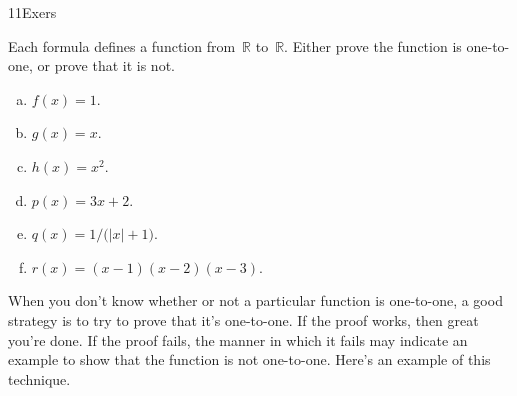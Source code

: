 
\begin{exercise}{11Exers}

 Each formula defines a function from~$\mathbb{R}$ to~$\mathbb{R}$. Either prove the function is one-to-one, or prove that it is not.
\begin{multicols}{2}
 \begin{enumerate}[(a)]
\item \label{11Exers-formula-f}
$f(x) = 1$.
\item \label{11Exers-formula-g}
$g(x) = x$.
\item \label{11Exers-formula-h}
$h(x) = x^2$.
\item \label{11Exers-formula-i}
$p(x) = 3x + 2$.
\item \label{11Exers-formula-j}
$q(x) = 1/ \bigl( |x| + 1 \bigr)$.
\item \label{11Exers-formula-k}
$r(x) = (x-1)(x-2)(x-3)$.
\end{enumerate}
\end{multicols}
\end{exercise}

When you don't know whether or not a particular function is one-to-one, a good strategy is to try to prove that it's one-to-one.  If the proof works, then great you're done.  If the proof fails, the manner in which it fails may indicate an example to show that the function is not one-to-one.  Here's an example of this technique.


